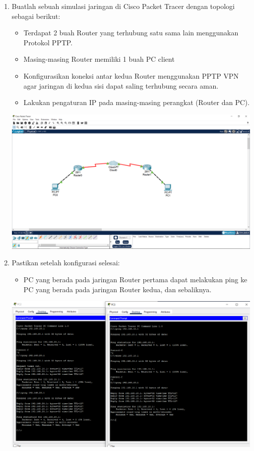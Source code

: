 \begin{enumerate}
    \item Buatlah sebuah simulasi jaringan di Cisco Packet Tracer dengan topologi sebagai berikut:
    \begin{itemize}
        \item Terdapat 2 buah Router yang terhubung satu sama lain menggunakan Protokol PPTP.
        \item Masing-masing Router memiliki 1 buah PC client
        \item Konfigurasikan koneksi antar kedua Router menggunakan PPTP VPN agar jaringan di kedua sisi dapat saling terhubung secara aman.
        \item Lakukan pengaturan IP pada masing-masing perangkat (Router dan PC).
    \end{itemize}
    \begin{center}
        \includegraphics[scale=0.2]{P1/img/topologi.png}        
    \end{center}
    \item Pastikan setelah konfigurasi selesai:
    \begin{itemize}
        \item PC yang berada pada jaringan Router pertama dapat melakukan ping ke PC yang berada pada jaringan Router kedua, dan sebaliknya.
    \end{itemize}
    \begin{center}
        \includegraphics[scale=0.5]{P1/img/jarkom5-1.png}        

\end{center}
\end{enumerate}
